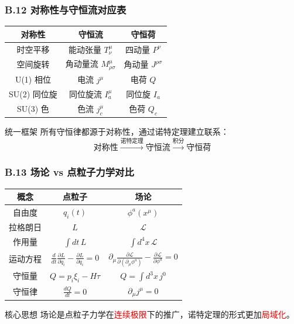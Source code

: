 \documentclass[xcolor=dvipsnames]{ctexbeamer}
\begin{document}
\begin{frame}
\frametitle{B.12 对称性与守恒流对应表}
\begin{center}
\begin{tabular}{|c|c|c|}
\hline
\textbf{对称性} & \textbf{守恒流} & \textbf{守恒荷} \\
\hline
时空平移 & 能动张量 $T^\mu_\nu$ & 四动量 $P^\nu$ \\
\hline
空间旋转 & 角动量流 $M^\mu_{\rho\sigma}$ & 角动量 $J^{\rho\sigma}$ \\
\hline
U(1) 相位 & 电流 $j^\mu$ & 电荷 $Q$ \\
\hline
SU(2) 同位旋 & 同位旋流 $I^\mu_a$ & 同位旋 $I_a$ \\
\hline
SU(3) 色 & 色流 $j^\mu_c$ & 色荷 $Q_c$ \\
\hline
\end{tabular}
\end{center}

\vspace{1em}

\begin{block}{统一框架}
所有守恒律都源于对称性，通过诺特定理建立联系：
$$\text{对称性} \xrightarrow{\text{诺特定理}} \text{守恒流} \xrightarrow{\text{积分}} \text{守恒荷}$$
\end{block}
\end{frame}

\begin{frame}
\frametitle{B.13 场论 vs 点粒子力学对比}
\begin{center}
\begin{tabular}{|c|c|c|}
\hline
\textbf{概念} & \textbf{点粒子} & \textbf{场论} \\
\hline
自由度 & $q_i(t)$ & $\phi^a(x^\mu)$ \\
\hline
拉格朗日 & $L$ & $\mathcal{L}$ \\
\hline
作用量 & $\int dt \, L$ & $\int d^4x \, \mathcal{L}$ \\
\hline
运动方程 & $\frac{d}{dt}\frac{\partial L}{\partial\dot{q}_i} - \frac{\partial L}{\partial q_i} = 0$ & $\partial_\mu\frac{\partial\mathcal{L}}{\partial(\partial_\mu\phi^a)} - \frac{\partial\mathcal{L}}{\partial\phi^a} = 0$ \\
\hline
守恒量 & $Q = p_i\xi_i - H\tau$ & $Q = \int d^3x \, j^0$ \\
\hline
守恒律 & $\frac{dQ}{dt} = 0$ & $\partial_\mu j^\mu = 0$ \\
\hline
\end{tabular}
\end{center}

\vspace{1em}

\begin{alertblock}{核心思想}
场论是点粒子力学在\textcolor{red}{连续极限}下的推广，诺特定理的形式更加\textcolor{red}{局域化}。
\end{alertblock}
\end{frame}
\end{document}
